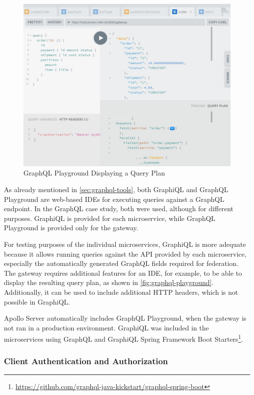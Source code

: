 \begin{figure}[!b]
    \centering
    \includegraphics[width=\textwidth]{images/graphql-playground.png}
    \caption{GraphQL Playground Displaying a Query Plan}\label{fig:graphql-playground}
\end{figure}

As already mentioned in \autoref{sec:graphql-tools}, both GraphiQL and GraphQL Playground are web-based \acp{IDE} for executing queries against a GraphQL endpoint.
In the GraphQL case study, both were used, although for different purposes.
GraphiQL is provided for each microservice, while GraphQL Playground is provided only for the gateway.

For testing purposes of the individual microservices, GraphiQL is more adequate because it allows running queries against the \ac{API} provided by each microservice, especially the automatically generated GraphQL fields required for federation.
The gateway requires additional features for an \ac{IDE}, for example, to be able to display the resulting query plan, as shown in \autoref{fig:graphql-playground}.
Additionally, it can be used to include additional \ac{HTTP} headers, which is not possible in GraphiQL.%

Apollo Server automatically includes GraphQL Playground, when the gateway is not ran in a production environment.
GraphiQL was included in the microservices using GraphQL and GraphiQL Spring Framework Boot Starters\footnote{\url{https://github.com/graphql-java-kickstart/graphql-spring-boot}}.

\subsubsection{Client Authentication and Authorization}

